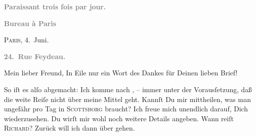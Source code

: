 \pstart
           \begin{otherlanguage}{french}\textcolor{gray}{\textbf{\textbf{Paraissant trois fois par jour.}}}\end{otherlanguage}\pend
           
\pstart
           \begin{otherlanguage}{french}\textcolor{gray}{\textbf{\textbf{Bureau à Paris}}}\end{otherlanguage}\hfill \textsc{Paris}, 4. Juni.\pend
           
\pstart
           \begin{otherlanguage}{french}\textcolor{gray}{\textbf{\textbf{24. Rue Feydeau.}}}\end{otherlanguage}\pend
           
\pstart\center{}Mein lieber Freund,\pend\vspace{0.5em}
\pstart
           In Eile nur ein Wort des Dankes für Deinen lieben Brief!\pend
           
\pstart
           So iſt es alſo abgemacht: Ich komme nach \label{K_L02776-1v}\label{K_L02776-1}, – immer unter  der Vorausſetzung, daß die
               weite Reiſe nicht über meine Mittel geht. Kannſt Du mir mittheilen, was man ungefähr
               pro Tag in \textsc{Scottsborg} braucht? {\pb}Ich freue mich unendlich darauf,
               Dich wiederzusehen. Du wirſt mir wohl noch weitere Details angeben. Wann reiſt \textsc{Richard}? Zurück will ich dann über \label{K_L02776-2v}\label{K_L02776-2} gehen.\pend
           
